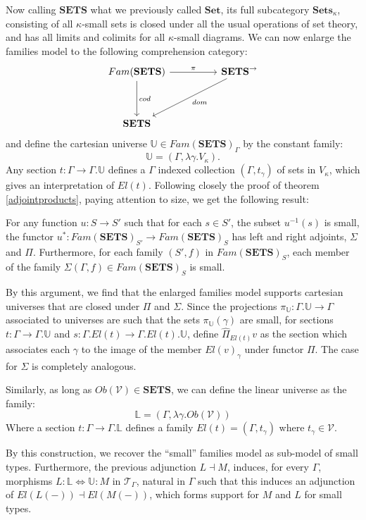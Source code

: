 \documentclass[a4paper,english]{lipics-v2018}
\begin{document}
Now calling $\mathbf{SETS}$ what we previously called $\mathbf{Set}$, its full subcategory $\mathbf{Sets}_\kappa$, consisting of all $\kappa$-small sets is closed under all the usual operations of set theory, and has all limits and colimits for all $\kappa$-small diagrams. We can now enlarge the families model to the following comprehension category:
\[
  \begin{tikzcd}[row sep=huge, column sep=huge]
  Fam(\mathbf{SETS}) \ar[r, "\pi"] \ar[d, "cod"] & \mathbf{SETS}^\to \ar[ld, "dom"]\\
  \mathbf{SETS}
  \end{tikzcd}
\]
and define the cartesian universe $\mathbb{U} \in Fam(\mathbf{SETS})_\Gamma$ by the constant family:
\[
\mathbb{U} = (\Gamma, \lambda \gamma. V_\kappa).
\]
Any section $t : \Gamma \to \Gamma.\mathbb{U}$ defines a $\Gamma$ indexed collection $(\Gamma, t_\gamma)$ of sets in $V_\kappa$, which gives an interpretation of $El(t)$. Following closely the proof of theorem \ref{adjointproducts}, paying attention to size, we get the following result:
\begin{corollary}
  For any function $u : S \to S'$  such that for each $s \in S'$, the subset $u^{-1}(s)$ is small, the functor  $u^* : Fam(\mathbf{SETS})_{S'} \to Fam(\mathbf{SETS})_S$ has left and right adjoints, $\Sigma$ and $\Pi$. Furthermore, for each family $(S', f)$ in $Fam(\mathbf{SETS})_S$, each member of the family $\Sigma(\Gamma, f) \in Fam(\mathbf{SETS})_S$ is small.
\end{corollary}
By this argument, we find that the enlarged families model supports cartesian universes that are closed under $\Pi$ and $\Sigma$. Since the projections $\pi_{\mathbb{U}} : \Gamma.\mathbb{U} \to \Gamma$ associated to universes are such that the sets $\pi_{\mathbb{U}}(\gamma)$ are small, for sections $t : \Gamma \to \Gamma.\mathbb{U}$ and $s : \Gamma.El(t) \to \Gamma.El(t).\mathbb{U}$, define $\hat \Pi_{El(t)}v$ as the section which associates each $\gamma$ to the image of the member $El(v)_\gamma$ under functor $\Pi$. The case for $\Sigma$ is completely analogous.


Similarly, as long as $Ob(\mathcal{V}) \in \mathbf{SETS}$, we can define the linear universe as the family:
\[
  \mathbb{L} = (\Gamma, \lambda \gamma. Ob(\mathcal{V}))
\]
Where a section $t : \Gamma \to \Gamma.\mathbb{L}$ defines a family $El(t) = (\Gamma, t_\gamma)$ where $t_\gamma \in \mathcal{V}$.

By this construction, we recover the ``small'' families model as sub-model of small types. Furthermore, the previous adjunction $L \dashv M$, induces, for every $\Gamma$, morphisms $L : \mathbb{L} \iff \mathbb{U} : M$ in $\mathcal{T}_{\Gamma}$, natural in $\Gamma$ such that this induces an adjunction of $El(L(-)) \dashv El(M(-))$, which forms support for $M$ and $L$ for small types.
\end{document}
